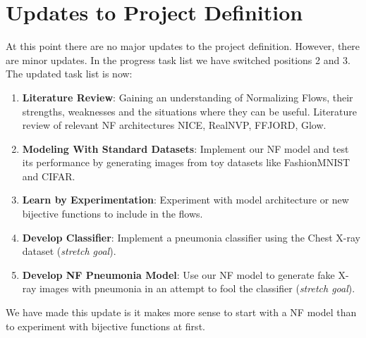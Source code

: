 \section{Updates to Project Definition}
At this point there are no major updates to the project definition. However,
   there are minor updates. In the progress task list we have switched positions
   2 and 3. The updated task list is now:
\begin{enumerate} 
	\item \textbf{Literature Review}: Gaining an understanding of
		Normalizing Flows, their strengths, weaknesses and the
		situations where they can be useful. Literature review of
		relevant NF architectures NICE\cite{nice},
		RealNVP\cite{real_nvp}, FFJORD\cite{ffjord}, Glow\cite{glow}.  
	\item \textbf{Modeling With Standard Datasets}: Implement our NF model
		and test its performance by generating images from toy datasets
		like FashionMNIST and CIFAR.  
	\item \textbf{Learn by Experimentation}: Experiment with model
		architecture or new bijective functions to include in the
		flows.  
	\item \textbf{Develop Classifier}: Implement a pneumonia classifier
		using the Chest X-ray dataset (\textit{stretch goal}).  
	\item \textbf{Develop NF Pneumonia Model}: Use our NF model to generate
		fake X-ray images with pneumonia in an attempt to fool the
		classifier (\textit{stretch goal}).  
\end{enumerate}
We have made this update is it makes more sense to start with a NF model than to
experiment with bijective functions at first. 

